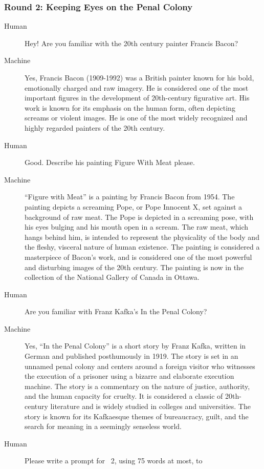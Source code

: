 \subsubsection{Round 2: Keeping Eyes on the Penal Colony}

\begin{description}
\item[Human] Hey! Are you familiar with the 20th century painter Francis Bacon?
\item[Machine] Yes, Francis Bacon (1909-1992) was a British painter known for his
    bold, emotionally charged and raw imagery. He is considered one of the most
    important figures in the development of 20th-century figurative art. His
    work is known for its emphasis on the human form, often depicting screams or
    violent images. He is one of the most widely recognized and highly regarded
    painters of the 20th century.
\item[Human] Good. Describe his painting Figure With Meat please.
\item[Machine] ``Figure with Meat'' is a painting by Francis Bacon from 1954.
    The painting depicts a screaming Pope, or Pope Innocent X, set against a
    background of raw meat. The Pope is depicted in a screaming pose, with his
    eyes bulging and his mouth open in a scream. The raw meat, which hangs
    behind him, is intended to represent the physicality of the body and the
    fleshy, visceral nature of human existence. The painting is considered a
    masterpiece of Bacon's work, and is considered one of the most powerful and
    disturbing images of the 20th century. The painting is now in the collection
    of the National Gallery of Canada in Ottawa.
\item[Human] Are you familiar with Franz Kafka's In the Penal Colony?
\item[Machine] Yes, ``In the Penal Colony'' is a short story by Franz Kafka,
    written in German and published posthumously in 1919. The story is set in an
    unnamed penal colony and centers around a foreign visitor who witnesses the
    execution of a prisoner using a bizarre and elaborate execution machine. The
    story is a commentary on the nature of justice, authority, and the human
    capacity for cruelty. It is considered a classic of 20th-century literature
    and is widely studied in colleges and universities. The story is known for
    its Kafkaesque themes of bureaucracy, guilt, and the search for meaning in a
    seemingly senseless world.
\item[Human] Please write a prompt for \dalle~2, using 75 words at most, to

\end{description}
